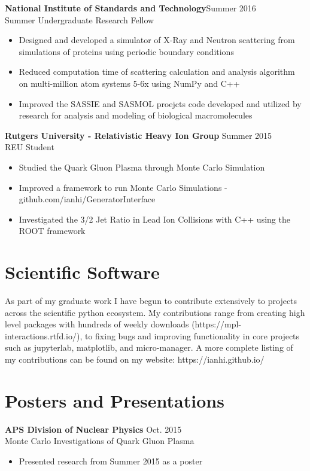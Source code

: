 \documentclass[margin]{res}
\begin{document}
\begin{resume}
	
	{\bf National Institute of Standards and Technology}\hfill Summer  2016\\ 
	Summer Undergraduate Research Fellow
	\begin{itemize} \itemsep -2pt  %
		\item Designed and developed a simulator of X-Ray and Neutron scattering from simulations of proteins using periodic boundary conditions
		\item Reduced computation time of scattering calculation and analysis algorithm on multi-million atom systems 5-6x using NumPy and C++
		\item Improved the SASSIE and SASMOL proejcts code developed and utilized by research for analysis and modeling of biological macromolecules
	\end{itemize}

	{\bf Rutgers University - Relativistic Heavy Ion Group} \hfill Summer  2015\\
	REU Student
	\begin{itemize} \itemsep -2pt  %
		\item Studied the Quark Gluon Plasma through Monte Carlo Simulation
		\item Improved a framework to run Monte Carlo Simulations - \tiny{github.com/ianhi/GeneratorInterface}\normalsize
		\item Investigated the 3/2 Jet Ratio in Lead Ion Collisions with C++ using the ROOT framework
	\end{itemize}
	 
\section{Scientific Software}
As part of my graduate work I have begun to contribute extensively to projects across the scientific python ecosystem. My contributions range from creating high level packages with hundreds of weekly downloads (https://mpl-interactions.rtfd.io/), to fixing bugs and improving functionality in core projects such as jupyterlab, matplotlib, and micro-manager. A more complete listing of my contributions can be found on my website: https://ianhi.github.io/

\section{Posters and Presentations}

{\bf APS Division of Nuclear Physics} \hfill Oct.  2015\\
Monte Carlo Investigations of Quark Gluon Plasma 
\begin{itemize} \itemsep -2pt  %
	\item Presented research from Summer 2015 as a poster 
\end{itemize}


\end{resume}
\end{document}
